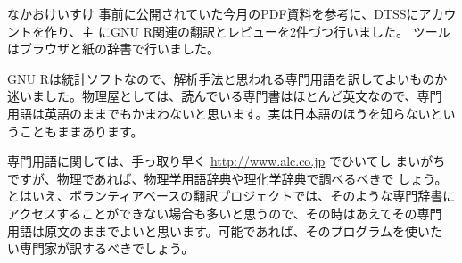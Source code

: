 \begin{prework}{なかおけいすけ}
事前に公開されていた今月のPDF資料を参考に、DTSSにアカウントを作り、主
 にGNU R関連の翻訳とレビューを2件づつ行いました。
 ツールはブラウザと紙の辞書で行いました。

GNU Rは統計ソフトなので、解析手法と思われる専門用語を訳してよいものか
 迷いました。物理屋としては、読んでいる専門書はほとんど英文なので、専門
用語は英語のままでもかまわないと思います。実は日本語のほうを知らないとい
 うこともままあります。

専門用語に関しては、手っ取り早く \url{http://www.alc.co.jp} でひいてし
 まいがちですが、物理であれば、物理学用語辞典や理化学辞典で調べるべきで
 しょう。とはいえ、ボランティアベースの翻訳プロジェクトでは、そのような専門辞書に
 アクセスすることができない場合も多いと思うので、その時はあえてその専門
 用語は原文のままでよいと思います。可能であれば、そのプログラムを使いた
 い専門家が訳するべきでしょう。
\end{prework}

